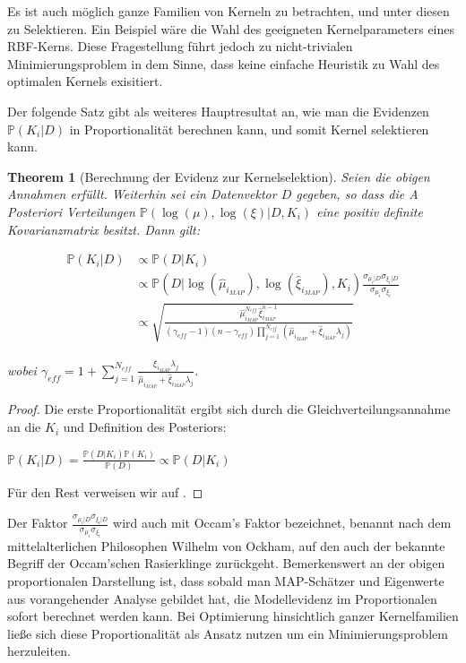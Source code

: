 \documentclass{report}
\theoremstyle{linebreak}
\newtheorem{theorem}[defi]{Theorem}
\begin{document}
Es ist auch möglich ganze Familien von Kerneln zu betrachten, und unter diesen zu Selektieren. Ein Beispiel wäre die Wahl des geeigneten Kernelparameters eines RBF-Kerns. Diese Fragestellung führt jedoch zu nicht-trivialen Minimierungsproblem in dem Sinne, dass keine einfache Heuristik zu Wahl des optimalen Kernels exisitiert.

Der folgende Satz gibt als weiteres Hauptresultat an, wie man die Evidenzen $\mathbb{P}(K_i \vert D)$ in Proportionalität berechnen kann, und somit Kernel selektieren kann.


\begin{theorem}[Berechnung der Evidenz zur Kernelselektion]
Seien die obigen Annahmen erfüllt. Weiterhin sei ein Datenvektor $D$ gegeben, so dass die A Posteriori Verteilungen $\mathbb{P}(\log(\mu),\log(\xi) \vert D, K_i)$ eine positiv definite Kovarianzmatrix besitzt. Dann gilt:

\begin{align*}
	\mathbb{P}(K_i \vert D) 
	&\propto \mathbb{P}(D \vert K_i)\\
 	&\propto \mathbb{P}(D \vert \log(\hat{\mu}_{i_{MAP}}), \log(\hat{\xi}_{i_{MAP}}), 			K_i)\frac{\sigma_{\mu_i\vert D} \sigma_{\xi_i\vert D}}{\sigma_{\mu_i} 						\sigma_{\xi_i}}\\
	&\propto \sqrt{\frac{\hat{\mu}^{N_{eff}}_{i_{MAP}} \hat{\xi}^{n-1}_{i_{MAP}}}				{(\gamma_{eff}-1)(n - \gamma_{eff}) \prod_{j=1}^{N_{eff}}(\hat{\mu}_{i_{MAP}} + 			\hat{\xi}_{i_{MAP}}\lambda_j)}}
\end{align*}

wobei $\gamma_{eff} = 1 + \sum_{j=1}^{N_{eff}}\frac{\hat{\xi}_{i_{MAP}}\lambda_j}{\hat{\mu}_{i_{MAP}} + \hat{\xi}_{i_{MAP}}\lambda_j}$.

\end{theorem}

\begin{proof}
Die erste Proportionalität ergibt sich durch die Gleichverteilungsannahme an die $K_i$ und Definition des Posteriors:

\begin{center}
	$\mathbb{P}(K_i \vert D) = \frac{\mathbb{P}(D\vert K_i)\mathbb{P}(K_i)}{\mathbb{P}			(D)}
	\propto \mathbb{P}(D \vert K_i)$
\end{center}
Für den Rest verweisen wir auf \cite{LS-SVM}.
\end{proof}

Der Faktor $\frac{\sigma_{\mu_i\vert D} \sigma_{\xi_i\vert D}}{\sigma_{\mu_i} 						\sigma_{\xi_i}}$ wird auch mit Occam's Faktor bezeichnet, benannt nach dem mittelalterlichen Philosophen Wilhelm von Ockham, auf den auch der bekannte Begriff der Occam'schen Rasierklinge zurückgeht. Bemerkenswert an der obigen proportionalen Darstellung ist, dass sobald man MAP-Schätzer und Eigenwerte aus vorangehender Analyse gebildet hat, die Modellevidenz im Proportionalen sofort berechnet werden kann. Bei Optimierung hinsichtlich ganzer Kernelfamilien ließe sich diese Proportionalität als Ansatz nutzen um ein Minimierungsproblem herzuleiten.






\nocite{*}


\end{document}

